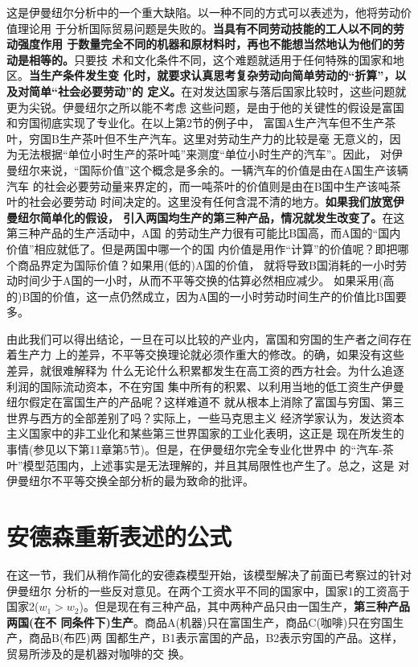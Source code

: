 这是伊曼纽尔分析中的一个重大缺陷。以一种不同的方式可以表述为，他将劳动价值理论用
于分析国际贸易问题是失败的。\textbf{当具有不同劳动技能的工人以不同的劳动强度作用
  于数量完全不同的机器和原材料时，再也不能想当然地认为他们的劳动是相等的。}只要技
术和文化条件不同，这个难题就适用于任何特殊的国家和地区。\textbf{当生产条件发生变
  化时，就要求认真思考复杂劳动向简单劳动的“折算”，以及对简单“社会必要劳动”的
  定义。}在对发达国家与落后国家比较时，这些问题就更为尖锐。伊曼纽尔之所以能不考虑
这些问题，是由于他的关键性的假设是富国和穷国彻底实现了专业化。在以上第2节的例子中，
富国A生产汽车但不生产茶叶，穷国B生产茶叶但不生产汽车。这里对劳动生产力的比较是毫
无意义的，因为无法根据“单位小时生产的茶叶吨”来测度“单位小时生产的汽车”。因此，
对伊曼纽尔来说，“国际价值”这个概念是多余的。一辆汽车的价值是由在A国生产该辆汽车
的社会必要劳动量来界定的，而一吨茶叶的价值则是由在B国中生产该吨茶叶的社会必要劳动
时间决定的。这里没有任何含混不清的地方。\textbf{如果我们放宽伊曼纽尔简单化的假设，
  引入两国均生产的第三种产品，情况就发生改变了。}在这第三种产品的生产活动中，A国
的劳动生产力很有可能比B国高，而A国的“国内价值”相应就低了。但是两国中哪一个的国
内价值是用作“计算”的价值呢？即把哪个商品界定为国际价值？如果用(低的)A国的价值，
就将导致B国消耗的一小时劳动时间少于A国的一小时，从而不平等交换的估算必然相应减少。
如果采用(高的)B国的价值，这一点仍然成立，因为A国的一小时劳动时间生产的价值比B国要
多。

由此我们可以得出结论，一旦在可以比较的产业内，富国和穷国的生产者之间存在着生产力
上的差异，不平等交换理论就必须作重大的修改。的确，如果没有这些差异，就很难解释为
什么无论什么积累都发生在高工资的西方社会。为什么追逐利润的国际流动资本，不在穷国
集中所有的积累、以利用当地的低工资生产伊曼纽尔假定在富国生产的产品呢？这样难道不
就从根本上消除了富国与穷国、第三世界与西方的全部差别了吗？实际上，一些马克思主义
经济学家认为，发达资本主义国家中的非工业化和某些第三世界国家的工业化表明，这正是
现在所发生的事情(参见以下第11章第5节)。但是，在伊曼纽尔完全专业化世界中
的“汽车-茶叶”模型范围内，上述事实是无法理解的，并且其局限性也产生了。总之，这是
对伊曼纽尔不平等交换全部分析的最为致命的批评。

\section{安德森重新表述的公式}

在这一节，我们从稍作简化的安德森模型开始，该模型解决了前面已考察过的针对伊曼纽尔
分析的一些反对意见。在两个工资水平不同的国家中，国家1的工资高于国家2($w_1 > w_2$)。但是现在有三种产品，其中两种产品只由一国生产，\textbf{第三种产品两国(在不
  同条件下)生产}。商品A(机器)只在富国生产，商品C(咖啡)只在穷国生产，商品B(布匹)两
国都生产，B1表示富国的产品，B2表示穷国的产品。这样，贸易所涉及的是机器对咖啡的交
换。


